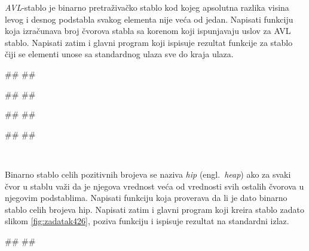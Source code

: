\begin{Exercise}[label=4_25]
\emph{AVL}-stablo je binarno pretraživačko stablo kod kojeg apsolutna razlika visina levog i desnog podstabla svakog elementa nije veća od jedan. Napisati funkciju  koja izračunava broj čvorova stabla sa korenom  koji ispunjavaju uslov za AVL stablo. Napisati zatim i glavni program koji ispisuje rezultat  funkcije za stablo čiji se elementi unose sa standardnog ulaza sve do kraja ulaza. 

\begin{miditest}
\begin{test}{1}
#\naslovUlaz#
##

#\naslovIzlaz#
##
\end{test}
\end{miditest}
\begin{miditest}
\begin{test}{2}
#\naslovUlaz#
##

#\naslovIzlaz#
##
\end{test}
\end{miditest}
\end{Exercise}

\begin{Answer}[ref=4_25]
\\
\end{Answer}


\begin{Exercise}[label=4_26]
Binarno stablo celih pozitivnih brojeva se naziva \emph{hip} (engl.~{\em heap}) ako za svaki čvor u stablu važi da je njegova vrednost veća od vrednosti svih ostalih čvorova u njegovim podstablima. Napisati funkciju  koja proverava da li je dato binarno stablo celih brojeva hip. Napisati zatim i glavni program koji kreira stablo zadato slikom \ref{fig:zadatak426}, poziva funkciju  i ispisuje rezultat na standardni izlaz. 

\begin{miditest}
\begin{test}{1}
#\naslovIzlaz#
##
\end{test}
\end{miditest}
\end{Exercise}

